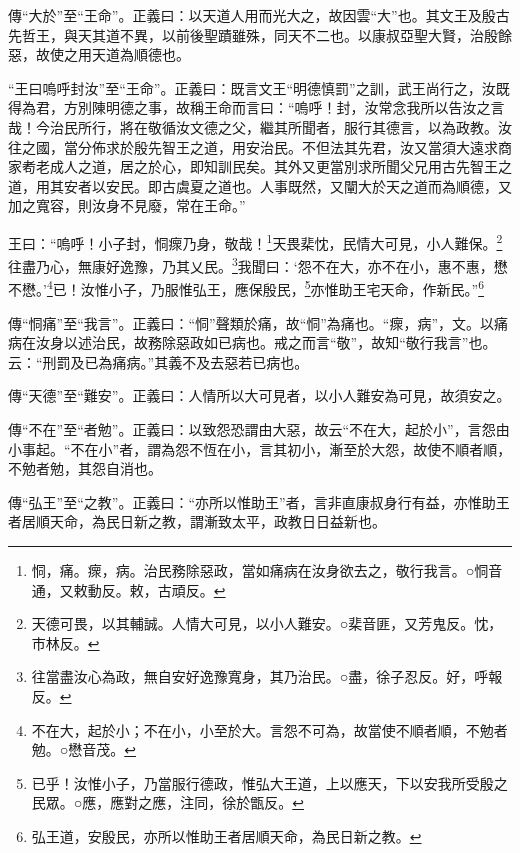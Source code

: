 {\noindent\zhuan{}\fzbyks 傳“大於”至“王命”。正義曰：以天道人用而光大之，故因雲“大”也。其文王及殷古先哲王，與天其道不異，以前後聖蹟雖殊，同天不二也。以康叔亞聖大賢，治殷餘惡，故使之用天道為順德也。 \par}

{\noindent\shu{}\fzkt “王曰嗚呼封汝”至“王命”。正義曰：既言文王“明德慎罰”之訓，武王尚行之，汝既得為君，方別陳明德之事，故稱王命而言曰：“嗚呼！封，汝常念我所以告汝之言哉！今治民所行，將在敬循汝文德之父，繼其所聞者，服行其德言，以為政教。汝往之國，當分佈求於殷先智王之道，用安治民。不但法其先君，汝又當須大遠求商家耇老成人之道，居之於心，即知訓民矣。其外又更當別求所聞父兄用古先智王之道，用其安者以安民。即古虞夏之道也。人事既然，又闡大於天之道而為順德，又加之寬容，則汝身不見廢，常在王命。” \par}

王曰：“嗚呼！小子封，恫瘝乃身，敬哉！\footnote{恫，痛。瘝，病。治民務除惡政，當如痛病在汝身欲去之，敬行我言。○恫音通，又敕動反。敕，古頑反。}天畏棐忱，民情大可見，小人難保。\footnote{天德可畏，以其輔誠。人情大可見，以小人難安。○棐音匪，又芳鬼反。忱，巿林反。}往盡乃心，無康好逸豫，乃其乂民。\footnote{往當盡汝心為政，無自安好逸豫寬身，其乃治民。○盡，徐子忍反。好，呼報反。}我聞曰：‘怨不在大，亦不在小，惠不惠，懋不懋。’\footnote{不在大，起於小；不在小，小至於大。言怨不可為，故當使不順者順，不勉者勉。○懋音茂。}已！汝惟小子，乃服惟弘王，應保殷民，\footnote{已乎！汝惟小子，乃當服行德政，惟弘大王道，上以應天，下以安我所受殷之民眾。○應，應對之應，注同，徐於甑反。}亦惟助王宅天命，作新民。”\footnote{弘王道，安殷民，亦所以惟助王者居順天命，為民日新之教。}


{\noindent\zhuan{}\fzbyks 傳“恫痛”至“我言”。正義曰：“恫”聲類於痛，故“恫”為痛也。“瘝，病”，文。以痛病在汝身以述治民，故務除惡政如已病也。戒之而言“敬”，故知“敬行我言”也。云：“刑罰及已為痛病。”其義不及去惡若已病也。 \par}

{\noindent\zhuan{}\fzbyks 傳“天德”至“難安”。正義曰：人情所以大可見者，以小人難安為可見，故須安之。 \par}

{\noindent\zhuan{}\fzbyks 傳“不在”至“者勉”。正義曰：以致怨恐謂由大惡，故云“不在大，起於小”，言怨由小事起。“不在小”者，謂為怨不恆在小，言其初小，漸至於大怨，故使不順者順，不勉者勉，其怨自消也。 \par}

{\noindent\zhuan{}\fzbyks 傳“弘王”至“之教”。正義曰：“亦所以惟助王”者，言非直康叔身行有益，亦惟助王者居順天命，為民日新之教，謂漸致太平，政教日日益新也。 \par}

